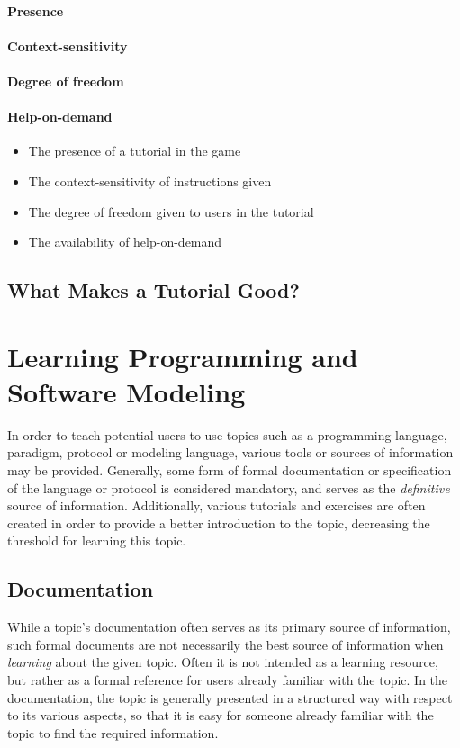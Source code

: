 \paragraph{Presence} 

\paragraph{Context-sensitivity}

\paragraph{Degree of freedom}

\paragraph{Help-on-demand}



\begin{itemize}
	\item The presence of a tutorial in the game
	\item The context-sensitivity of instructions given
	\item The degree of freedom given to users in the tutorial
	\item The availability of help-on-demand
\end{itemize}  


\subsection{What Makes a Tutorial Good?}


\section{Learning Programming and Software Modeling}
\label{sec:learning_programming}
In order to teach potential users to use topics such as a programming language, paradigm, protocol or modeling language, various tools or sources of information may be provided. Generally, some form of formal documentation or specification of the language or protocol is considered mandatory, and serves as the \emph{definitive} source of information. Additionally, various tutorials and exercises are often created in order to provide a better introduction to the topic, decreasing the threshold for learning this topic.

\subsection{Documentation}
While a topic's documentation often serves as its primary source of information, such formal documents are not necessarily the best source of information when \emph{learning} about the given topic. Often it is not intended as a learning resource, but rather as a formal reference for users already familiar with the topic. In the documentation, the topic is generally presented in a structured way with respect to its various aspects, so that it is easy for someone already familiar with the topic to find the required information.

